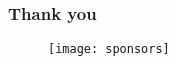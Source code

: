 \documentclass{beamer}
\begin{document}
\begin{frame}
\frametitle{Thank you}
  \begin{figure}
  \texttt{[image: sponsors]}
  \end{figure}
\end{frame}
\end{document}
